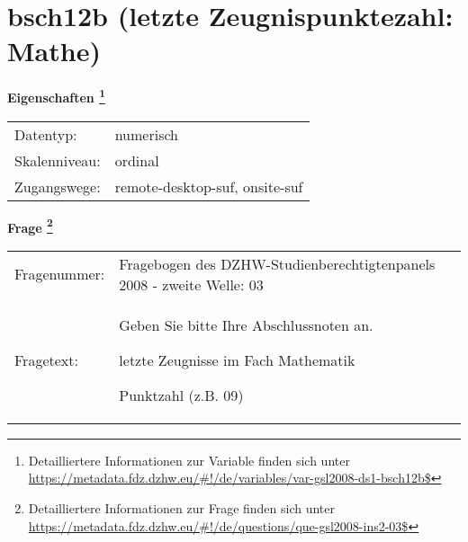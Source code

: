 
    \setcounter{footnote}{0}

    \vspace*{-1.8cm}
	\section{bsch12b (letzte Zeugnispunktezahl: Mathe)}
	\label{section:bsch12b}



    \vspace*{0.5cm}
    \noindent\textbf{Eigenschaften
	\footnote{Detailliertere Informationen zur Variable finden sich unter
		\url{https://metadata.fdz.dzhw.eu/\#!/de/variables/var-gsl2008-ds1-bsch12b$}}}\\
	\begin{tabularx}{\hsize}{@{}lX}
	Datentyp: & numerisch \\
	Skalenniveau: & ordinal \\
	Zugangswege: &
	  remote-desktop-suf, 
	  onsite-suf
 \\
    \end{tabularx}



				\vspace*{0.5cm}
                \noindent\textbf{Frage
	                \footnote{Detailliertere Informationen zur Frage finden sich unter
		              \url{https://metadata.fdz.dzhw.eu/\#!/de/questions/que-gsl2008-ins2-03$}}}\\
				\begin{tabularx}{\hsize}{@{}lX}
					Fragenummer: &
					  Fragebogen des DZHW-Studienberechtigtenpanels 2008 - zweite Welle:
					  03
 \\
					Fragetext: & Geben Sie bitte Ihre Abschlussnoten an.\par  letzte Zeugnisse im Fach Mathematik\par  Punktzahl (z.B. 09) \\
				\end{tabularx}





